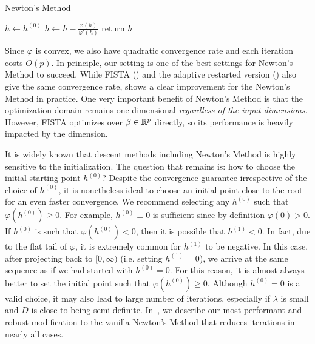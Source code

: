 \begin{algorithm}
    \caption{Newton's Method}\label{alg:newton:newton}
    $h \gets h^{(0)}$\;
     {
        $h \gets h - \frac{\varphi(h)}{\varphi'(h)}$\;
    }
    return $h$\;
\end{algorithm}

Since $\varphi$ is convex, we also have quadratic convergence rate and each iteration costs $O(p)$.
In principle, our setting is one of the best settings for Newton's Method to succeed.
While FISTA () and the adaptive restarted version
() also give the same convergence rate,
shows a clear improvement for the Newton's Method in practice.
One very important benefit of Newton's Method is that the optimization domain
remains one-dimensional \emph{regardless of the input dimensions}.
However, FISTA optimizes over $\beta \in \mathbb{R}^p$ directly, so its performance is heavily
impacted by the dimension.

It is widely known that descent methods including Newton's Method
is highly sensitive to the initialization.
The question that remains is: how to choose the initial starting point $h^{(0)}$?
Despite the convergence guarantee irrespective of the choice of $h^{(0)}$,
it is nonetheless ideal to choose an initial point close to the root for an even faster convergence.
We recommend selecting any $h^{(0)}$ such that $\varphi(h^{(0)}) \geq 0$.
For example, $h^{(0)} \equiv 0$ is sufficient since by definition $\varphi(0) > 0$.
If $h^{(0)}$ is such that $\varphi(h^{(0)}) < 0$,
then it is possible that $h^{(1)} < 0$.
In fact, due to the flat tail of $\varphi$, it is extremely common for $h^{(1)}$ to be negative.
In this case, after projecting back to $[0, \infty)$ (i.e. setting $h^{(1)} = 0$),
we arrive at the same sequence as if we had started with $h^{(0)} = 0$.
For this reason, it is almost always better to 
set the initial point such that $\varphi(h^{(0)}) \geq 0$.
Although $h^{(0)} = 0$ is a valid choice, it may also lead to large number of iterations,
especially if $\lambda$ is small and $D$ is close to being semi-definite.
In~, we describe our most performant and robust 
modification to the vanilla Newton's Method that reduces iterations in nearly all cases.
